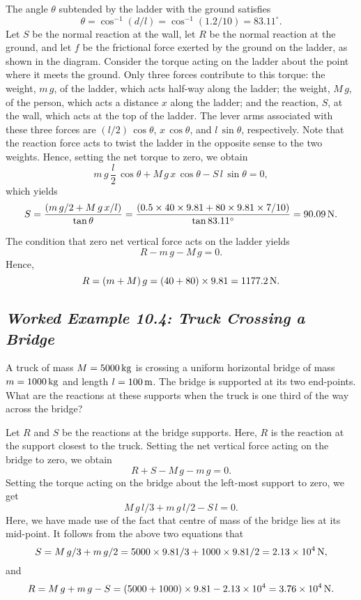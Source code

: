  The angle $\theta$ subtended by the ladder with the ground 
satisfies
$$
\theta = \cos^{-1}(d/l)= \cos^{-1}(1.2/10) = 83.11^\circ.
$$
Let $S$ be the normal reaction at the wall, let $R$ be the normal reaction at the ground,
and let $f$ be the frictional force exerted by the ground on the ladder, as shown
in the diagram. Consider the torque acting on the ladder about the point where
it meets the ground. Only three forces contribute to this torque: the weight, $m\,g$, of
the ladder, which acts half-way along the ladder; the weight, $M\,g$, of the person,
which acts a distance $x$ along the ladder; and the reaction, $S$, at the wall, which acts
at the top of the ladder. The lever arms associated with these three forces are
$(l/2)\,\cos\theta$, $x\,\cos\theta$, and $l\,\sin\theta$, respectively. 
Note that the reaction force acts to twist the ladder in the opposite sense to
the two weights. Hence, setting the net torque to zero, we obtain
$$
m\,g\,\frac{l}{2}\,\cos\theta + M\,g\,x\,\cos\theta - S\,l\,\sin\theta = 0,
$$
which yields
$$
S = \frac{(m\,g/2 + M\,g\,x/l)}{\tan\theta} = \frac{(0.5\times 40\times 9.81+
80\times 9.81\times 7/10)}{\tan 83.11^\circ} = 90.09\,{\rm N}.
$$

The condition that zero net vertical force acts on the ladder yields
$$
R - m\,g - M\,g = 0.
$$
Hence,
$$
R = (m+M)\,g = (40+80)\times 9.81 = 1177.2\,{\rm N}.
$$

\subsection*{\em Worked Example 10.4: Truck Crossing a Bridge}
 A truck of mass $M=5000\,{\rm kg}$ is crossing
a uniform horizontal bridge of mass $m=1000\,{\rm kg}$ and length $l=100\,{\rm m}$.
The bridge is supported at its two end-points. What are the reactions
at these supports when the truck is one third of the way across the bridge?

\begin{figure*}[h]
\epsfysize=1.5in
\centerline{}
\end{figure*}

 Let $R$ and $S$ be the reactions at the bridge supports.
Here, $R$ is the reaction at the support closest to the truck. Setting the net vertical
force acting on the bridge to zero, we obtain
$$
R+S-M\,g - m\,g = 0.
$$
Setting the torque acting on the bridge about the left-most support to zero,
we get
$$
M\,g\,l/3 + m\,g\,l/2 - S\,l = 0.
$$
Here, we have made use of the fact that centre of mass of the bridge lies at its
mid-point. It follows from the above two equations that
$$
S = M\,g/3 + m\,g/2 = 5000\times 9.81/3 + 1000\times 9.81 /2 = 2.13\times 10^4\,{\rm N},
$$
and
$$
R = M\,g + m\,g - S = (5000+1000)\times 9.81- 2.13\times 10^4 = 3.76\times 10^4\,{\rm N}.
$$

